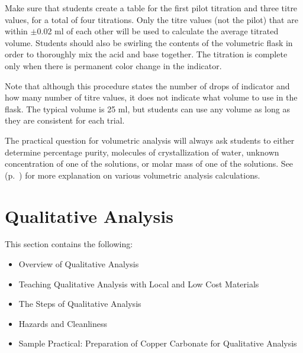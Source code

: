 Make sure that students create a table for the first pilot titration and three titre values, for a total of four titrations. Only the titre values (not the pilot) that are within $\pm$0.02 ml of each other will be used to calculate the average titrated volume. Students should also be swirling the contents of the volumetric flask in order to thoroughly mix the acid and base together. The titration is complete only when there is permanent color change in the indicator.

Note that although this procedure states the number of drops of indicator and how many number of titre values, it does not indicate what volume to use in the flask. The typical volume is 25 ml, but students can use any volume as long as they are consistent for each trial.

The practical question for volumetric analysis will always ask students to either determine percentage purity, molecules of crystallization of water, unknown concentration of one of the solutions, or molar mass of one of the solutions. See  (p.~\pageref{sub:titcalc}) for more explanation on various volumetric analysis calculations.





\section{Qualitative Analysis}
\label{cha:qualana}

This section contains the following:
\begin{itemize}
\item Overview of Qualitative Analysis
\item Teaching Qualitative Analysis with Local and Low Cost Materials
\item The Steps of Qualitative Analysis
\item Hazards and Cleanliness
\item Sample Practical: Preparation of Copper Carbonate for Qualitative Analysis
\end{itemize}

